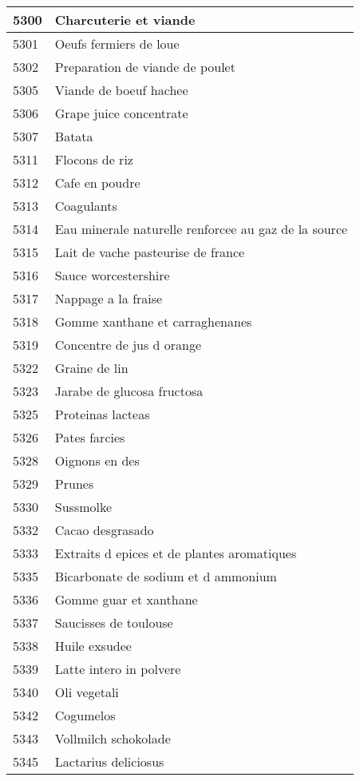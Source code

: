 \begin{longtable}{|l|l|}
5300 & Charcuterie et viande \\ \hline 
5301 & Oeufs fermiers de loue \\ \hline 
5302 & Preparation de viande de poulet \\ \hline 
5305 & Viande de boeuf hachee \\ \hline 
5306 & Grape juice concentrate \\ \hline 
5307 & Batata \\ \hline 
5311 & Flocons de riz \\ \hline 
5312 & Cafe en poudre \\ \hline 
5313 & Coagulants \\ \hline 
5314 & Eau minerale naturelle renforcee au gaz de la source \\ \hline 
5315 & Lait de vache pasteurise de france \\ \hline 
5316 & Sauce worcestershire \\ \hline 
5317 & Nappage a la fraise \\ \hline 
5318 & Gomme xanthane et carraghenanes \\ \hline 
5319 & Concentre de jus d orange \\ \hline 
5322 & Graine de lin \\ \hline 
5323 & Jarabe de glucosa fructosa \\ \hline 
5325 & Proteinas lacteas \\ \hline 
5326 & Pates farcies \\ \hline 
5328 & Oignons en des \\ \hline 
5329 & Prunes \\ \hline 
5330 & Sussmolke \\ \hline 
5332 & Cacao desgrasado \\ \hline 
5333 & Extraits d epices et de plantes aromatiques \\ \hline 
5335 & Bicarbonate de sodium et d ammonium \\ \hline 
5336 & Gomme guar et xanthane \\ \hline 
5337 & Saucisses de toulouse \\ \hline 
5338 & Huile exsudee \\ \hline 
5339 & Latte intero in polvere \\ \hline 
5340 & Oli vegetali \\ \hline 
5342 & Cogumelos \\ \hline 
5343 & Vollmilch schokolade \\ \hline 
5345 & Lactarius deliciosus \\ \hline 

\end{longtable}
